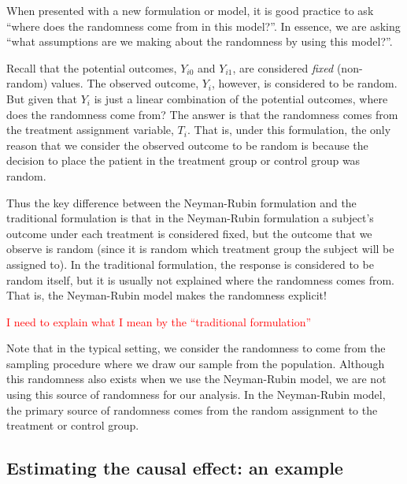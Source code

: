 When presented with a new formulation or model, it is good practice to ask ``where does the randomness come from in this model?''. In essence, we are asking ``what assumptions are we making about the randomness by using this model?''.

Recall that the potential outcomes, $Y_{i0}$ and $Y_{i1}$, are considered \emph{fixed} (non-random) values. The observed outcome, $Y_i$, however, is considered to be random. But given that $Y_i$ is just a linear combination of the potential outcomes, where does the randomness come from? The answer is that the randomness comes from the treatment assignment variable, $T_i$. That is, under this formulation, the only reason that we consider the observed outcome to be random is because the decision to place the patient in the treatment group or control group was random.


Thus the key difference between the Neyman-Rubin formulation and the traditional formulation is that in the Neyman-Rubin formulation a subject's outcome under each treatment is considered fixed, but the outcome that we observe is random (since it is random which treatment group the subject will be assigned to). In the traditional formulation, the response is considered to be random itself, but it is usually not explained where the randomness comes from. That is, the Neyman-Rubin model makes the randomness explicit!

\textcolor{red}{I need to explain what I mean by the ``traditional formulation''}

Note that in the typical setting, we consider the randomness to come from the sampling procedure where we draw our sample from the population. Although this randomness also exists when we use the Neyman-Rubin model, we are not using this source of randomness for our analysis. In the Neyman-Rubin model, the primary source of randomness comes from the random assignment to the treatment or control group.

\subsection*{Estimating the causal effect: an example}


